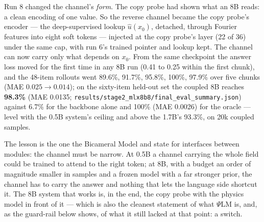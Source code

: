 \documentclass[11pt]{article}
\newcommand{\psilm}{$\Psi$LM}
\newcommand{\code}[1]{\texttt{#1}}
\begin{document}
Run 8 changed the channel's \emph{form}. The copy probe had shown what an 8B reads: a clean encoding of one value. So the reverse channel became the copy probe's encoder --- the deep-supervised lookup $\hat u(\hat x_0)$, detached, through Fourier features into eight soft tokens --- injected at the copy probe's layer (22 of 36) under the same cap, with run 6's trained pointer and lookup kept. The channel can now carry only what depends on $x_0$. From the same checkpoint the answer loss moved for the first time in any 8B run (0.41 to 0.25 within the first chunk), and the 48-item rollouts went 89.6\%, 91.7\%, 95.8\%, 100\%, 97.9\% over five chunks (MAE $0.025\to0.014$); on the sixty-item held-out set the coupled 8B reaches \textbf{98.3\%} (MAE 0.0135; \code{results/stage2\_mlx8b8/final\_eval\_summary.json}) against 6.7\% for the backbone alone and 100\% (MAE 0.0026) for the oracle --- level with the 0.5B system's ceiling and above the 1.7B's 93.3\%, on 20k coupled samples.

\begin{table}[t]
\centering
\caption{The 8B runs from the deterministic pointer onward. Pointer = $|\hat x_0 - x_0|$ at the end of the run; gate and injection are measured at the answer positions; accuracy is acc@0.05 on 48 held-out items at the last chunk (run 5: $n{=}60$).}
\label{tab:8bruns}
\small
{}
\end{table}

The lesson is the one the Bicameral Model \citep{flamant2026bicameral} and \citet{bena2024specialization} state for interfaces between modules: the channel must be narrow. At 0.5B a channel carrying the whole field could be trained to attend to the right token; at 8B, with a budget an order of magnitude smaller in samples and a frozen model with a far stronger prior, the channel has to carry the answer and nothing that lets the language side shortcut it. The 8B system that works is, in the end, the copy probe with the physics model in front of it --- which is also the cleanest statement of what \psilm{} is, and, as the guard-rail below shows, of what it still lacked at that point: a switch.
\end{document}
